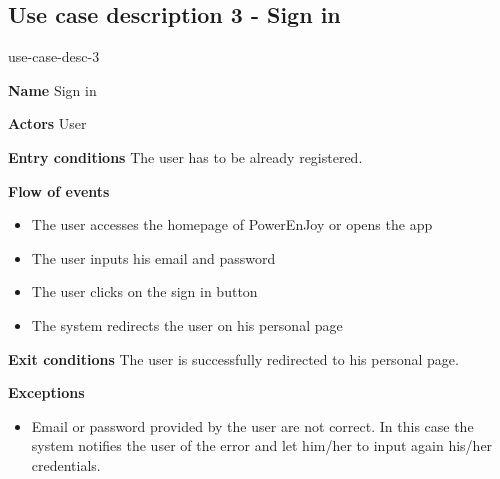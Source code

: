 \subsection{Use case description 3 - Sign in}
\begin{labeling}{use-case-desc-3}
		\item[\textbf{Name}] Sign in
		\item[\textbf{Actors}] User
		\item[\textbf{Entry conditions}] The user has to be already registered.
		\item[\textbf{Flow of events}]
			\begin{itemize}
				\item[]
				\item The user accesses the homepage of PowerEnJoy or opens the app
				\item The user inputs his email and password
				\item The user clicks on the sign in button
				\item The system redirects the user on his personal page
			\end{itemize}
		\item[\textbf{Exit conditions}] The user is successfully redirected to his personal page.
		\item[\textbf{Exceptions}]
			\begin{itemize}
				\item[]
				\item Email or password provided by the user are not correct. In this case the system notifies the user of the error and let him/her to input again his/her credentials. 
			\end{itemize}
	\end{labeling}
	
